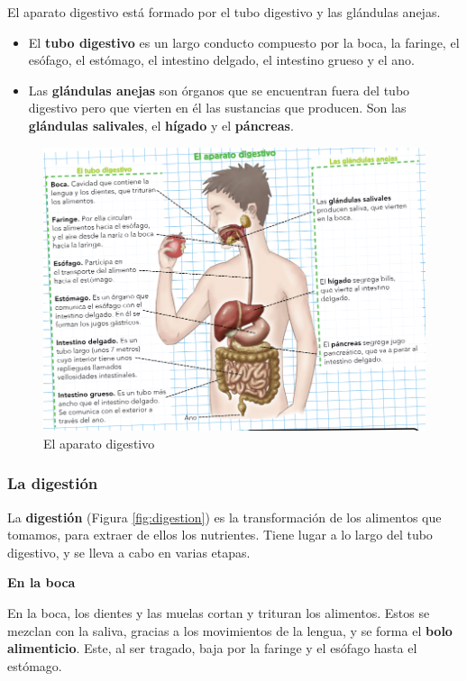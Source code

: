 El aparato digestivo está formado por el tubo digestivo y las glándulas anejas.

\begin{itemize}
    \item El \textbf{tubo digestivo} es un largo conducto compuesto por la boca, la faringe, el esófago, el estómago, el intestino delgado, el intestino grueso y el ano.
    \item Las \textbf{glándulas anejas} son órganos que se encuentran fuera del tubo digestivo pero que vierten en él las sustancias que producen. Son las \textbf{glándulas salivales}, el \textbf{hígado} y el \textbf{páncreas}.
\end{itemize}

\begin{figure}[!ht]
    \centering
    \includegraphics[width=0.8\linewidth]{Tema3/02_Aparato_digestivo.png}
    \caption{El aparato digestivo}
    \label{fig:aparato-digestivo}
\end{figure}

\subsubsection{La digestión}

La \textbf{digestión} (Figura \ref{fig:digestion}) es la transformación de los alimentos que tomamos, para extraer de ellos los nutrientes. Tiene lugar a lo largo del tubo digestivo, y se lleva a cabo en varias etapas.

\vspace{3mm}
\textbf{En la boca}

\vspace{3mm}
En la boca, los dientes y las muelas cortan y trituran los alimentos. Estos se mezclan con la saliva, gracias a los movimientos de la lengua, y se forma el \textbf{bolo alimenticio}. Este, al ser tragado, baja por la faringe y el esófago hasta el estómago.

